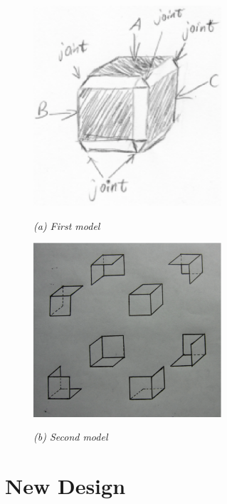 \begin{figure}[htb]
  \begin{minipage}[t]{2.75in}
    \centering
    \centerline{\mbox{\includegraphics[width=2.75in]{phantom/images/brain_storm/model1.eps}}}
    \centerline{\emph{(a) First model}}
  \end{minipage}\medskip
  \begin{minipage}[t]{2.75in}
    \centering
    \centerline{\mbox{\includegraphics[width=2.75in]{phantom/images/brain_storm/model2.eps}}}
    \centerline{\emph{(b) Second model}}
  \end{minipage}
\end{figure}


\section{New Design}

